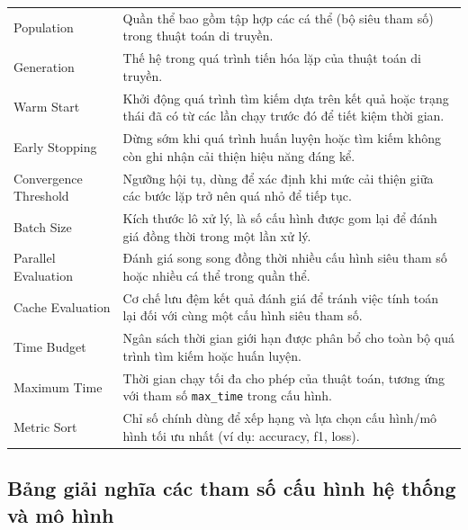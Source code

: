 \documentclass[12pt,a4paper]{article}
\begin{document}
\begin{longtable}{p{} p{}}
Population & Quần thể bao gồm tập hợp các cá thể (bộ siêu tham số) trong thuật toán di truyền. \\
Generation & Thế hệ trong quá trình tiến hóa lặp của thuật toán di truyền. \\
Warm Start & Khởi động quá trình tìm kiếm dựa trên kết quả hoặc trạng thái đã có từ các lần chạy trước đó để tiết kiệm thời gian. \\
Early Stopping & Dừng sớm khi quá trình huấn luyện hoặc tìm kiếm không còn ghi nhận cải thiện hiệu năng đáng kể. \\
Convergence Threshold & Ngưỡng hội tụ, dùng để xác định khi mức cải thiện giữa các bước lặp trở nên quá nhỏ để tiếp tục. \\
Batch Size & Kích thước lô xử lý, là số cấu hình được gom lại để đánh giá đồng thời trong một lần xử lý. \\
Parallel Evaluation & Đánh giá song song đồng thời nhiều cấu hình siêu tham số hoặc nhiều cá thể trong quần thể. \\
Cache Evaluation & Cơ chế lưu đệm kết quả đánh giá để tránh việc tính toán lại đối với cùng một cấu hình siêu tham số. \\
Time Budget & Ngân sách thời gian giới hạn được phân bổ cho toàn bộ quá trình tìm kiếm hoặc huấn luyện. \\
Maximum Time & Thời gian chạy tối đa cho phép của thuật toán, tương ứng với tham số \texttt{max\_time} trong cấu hình. \\
Metric Sort & Chỉ số chính dùng để xếp hạng và lựa chọn cấu hình/mô hình tối ưu nhất (ví dụ: accuracy, f1, loss). \\
\end{longtable}

\newpage
\subsection{Bảng giải nghĩa các tham số cấu hình hệ thống và mô hình}
\end{document}
